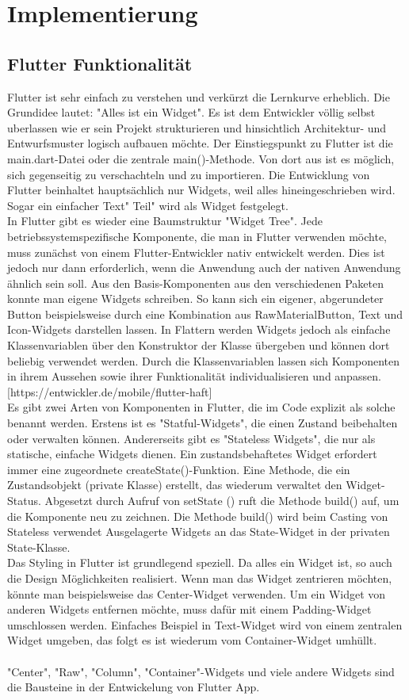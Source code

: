 \section{Implementierung}
\subsection{Flutter Funktionalität}
Flutter ist sehr einfach zu verstehen und verkürzt die Lernkurve erheblich. Die Grundidee lautet: "Alles ist ein Widget". Es ist dem Entwickler völlig selbst uberlassen wie er sein Projekt
strukturieren und hinsichtlich Architektur- und Entwurfsmuster logisch aufbauen möchte. Der Einstiegspunkt zu Flutter ist die main.dart-Datei oder die zentrale main()-Methode. Von dort aus ist es möglich, sich gegenseitig zu verschachteln und zu importieren. 
Die Entwicklung von Flutter beinhaltet hauptsächlich nur Widgets, weil alles hineingeschrieben wird.
Sogar ein einfacher Text" Teil" wird als Widget festgelegt. 
\\
In Flutter gibt es wieder eine Baumstruktur "Widget Tree". Jede betriebssystemspezifische Komponente, die man in Flutter verwenden möchte, muss zunächst von einem Flutter-Entwickler nativ entwickelt werden. Dies ist jedoch nur dann erforderlich, wenn die Anwendung auch der nativen Anwendung ähnlich sein soll. 
Aus den Basis-Komponenten aus den verschiedenen Paketen konnte man eigene Widgets schreiben. So kann sich ein eigener, abgerundeter Button beispielsweise durch eine Kombination aus RawMaterialButton, Text und Icon-Widgets darstellen lassen.
In Flattern werden Widgets jedoch als einfache Klassenvariablen über den Konstruktor der Klasse übergeben und können dort beliebig verwendet werden.
Durch die Klassenvariablen lassen sich Komponenten in
ihrem Aussehen sowie ihrer Funktionalität individualisieren und anpassen.[https://entwickler.de/mobile/flutter-haft]\\
Es gibt zwei Arten von Komponenten in Flutter, die im Code explizit als solche benannt werden. Erstens ist es "Statful-Widgets", die einen Zustand beibehalten oder verwalten können. Andererseits gibt es "Stateless Widgets", die nur als statische, einfache Widgets dienen. Ein zustandsbehaftetes Widget erfordert immer eine zugeordnete createState()-Funktion. Eine Methode, die ein Zustandsobjekt (private Klasse) erstellt, das wiederum
verwaltet den Widget-Status. Abgesetzt durch Aufruf von setState ()
ruft die Methode build() auf, um die Komponente neu zu zeichnen. Die Methode build() wird beim Casting von Stateless verwendet
Ausgelagerte Widgets an das State-Widget in der privaten State-Klasse.\\
Das Styling in Flutter ist grundlegend speziell. Da alles ein Widget ist, so auch die Design Möglichkeiten realisiert.
Wenn man das Widget zentrieren möchten, könnte man beispielsweise das Center-Widget verwenden.
Um ein Widget von anderen Widgets entfernen möchte, muss dafür mit einem Padding-Widget umschlossen werden. Einfaches Beispiel in Text-Widget wird von einem zentralen Widget umgeben, das folgt
es ist wiederum vom Container-Widget umhüllt.\\\\
"Center", "Raw", "Column", "Container"-Widgets und viele andere Widgets
sind die Bausteine in der Entwickelung von Flutter App.
